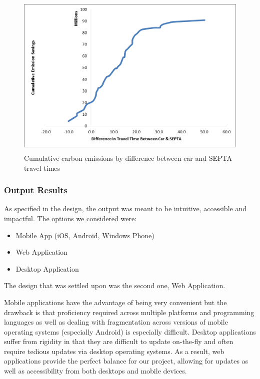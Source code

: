 \begin{figure}[htp]
  \centering
  \includegraphics[height=8cm]{graphics/graph2.png}
  \caption{Cumulative carbon emissions by difference between car and SEPTA travel times}
\end{figure}

\subsubsection{Output Results}

As specified in the design, the output was meant to be intuitive,
accessible and impactful. The options we considered were:

\begin{itemize}
    \item Mobile App (iOS, Android, Windows Phone)
    \item Web Application
    \item Desktop Application
\end{itemize}

The design that was settled upon was the second one, Web Application.

Mobile applications have the advantage of being very convenient but
the drawback is that proficiency required across multiple platforms
and programming languages as well as dealing with fragmentation across
versions of mobile operating systems (especially Android) is
especially difficult. Desktop applications suffer from rigidity in
that they are difficult to update on-the-fly and often require tedious
updates via desktop operating systems. As a result, web applications
provide the perfect balance for our project, allowing for updates as
well as accessibility from both desktops and mobile devices.

